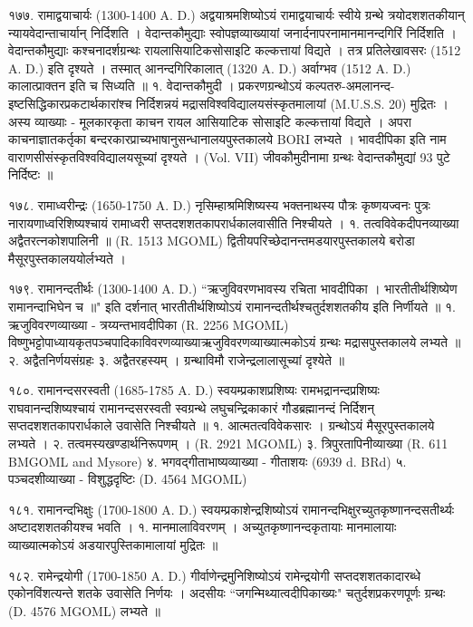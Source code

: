 १७७. रामाद्वयाचार्यः (1300-1400 A. D.)
अद्वयाश्रमशिष्योऽयं रामाद्वयाचार्यः स्वीये ग्रन्थे त्रयोदशशतकीयान् न्यायवेदान्ताचार्यान् निर्दिशति । वेदान्तकौमुद्याः स्वोपज्ञव्याख्यायां जनार्दनापरनामानमानन्दगिरिं निर्दिशति । वेदान्तकौमुद्याः कश्चनादर्शग्रन्थः रायलासियाटिकसोसाइटि कल्कत्तायां विद्यते । तत्र प्रतिलेखावसरः (1512 A. D.) इति दृश्यते । तस्मात् आनन्दगिरिकालात् (1320 A. D.) अर्वाग्भव (1512 A. D.) कालात्प्राक्तन इति च सिध्यति ॥
१. वेदान्तकौमुदी । प्रकरणग्रन्थोऽयं कल्पतरु-अमलानन्द-इष्टसिद्धिकारप्रकटार्थकारांश्च निर्दिशन्नयं मद्रासविश्वविद्यालयसंस्कृतमालायां (M.U.S.S. 20) मुद्रितः । 
अस्य व्याख्याः - मूलकारकृता काचन रायल आसियाटिक सोसाइटि कल्कत्तायां विद्यते । अपरा काचनाज्ञातकर्तृका बन्दरकारप्राच्यभाषानुसन्धानालयपुस्तकालये BORI लभ्यते । भावदीपिका इति नाम वाराणसीसंस्कृतविश्वविद्यालयसूच्यां दृश्यते । (Vol. VII) जीवकौमुदीनामा ग्रन्थः वेदान्तकौमुद्यां 93 पुटे निर्दिष्टः ॥

१७८. रामाध्वरीन्द्रः (1650-1750 A. D.)
नृसिम्हाश्रमिशिष्यस्य भक्तनाथस्य पौत्रः कृष्णयज्वनः पुत्रः नारायणाध्वरिशिष्यश्चायं रामाध्वरी सप्तदशशतकापरार्धकालवासीति निश्चीयते ।
१. तत्वविवेकदीपनव्याख्या अद्वैतरत्नकोशपालिनी ॥ (R. 1513 MGOML) द्वितीयपरिच्छेदानन्तमडयारपुस्तकालये बरोडा मैसूरपुस्तकालययोर्लभ्यते ।

१७९. रामानन्दतीर्थः (1300-1400 A. D.) 
``ऋजुविवरणभावस्य रचिता भावदीपिका । भारतीतीर्थशिष्येण रामानन्दाभिघेन च ॥" इति दर्शनात् भारतीतीर्थशिष्योऽयं रामानन्दतीर्थश्चतुर्दशशतकीय इति निर्णीयते ॥
१. ऋजुविवरणव्याख्या - त्रय्यन्तभावदीपिका (R. 2256 MGOML) विष्णुभट्टोपाध्यायकृतपञ्चपादिकाविवरणव्याख्याऋजुविवरणव्याख्यात्मकोऽयं ग्रन्थः मद्रासपुस्तकालये लभ्यते ॥
२. अद्वैतनिर्णयसंग्रहः
३. अद्वैतरहस्यम् । ग्रन्थाविमौ राजेन्द्रलालासूच्यां दृश्येते ॥

१८०. रामानन्दसरस्वती (1685-1785 A. D.)
स्वयम्प्रकाशप्रशिष्यः रामभद्रानन्दप्रशिष्यः राघवानन्दशिष्यश्चायं रामानन्दसरस्वती स्वग्रन्थे लघुचन्द्रिकाकारं गौडब्रह्मानन्दं निर्दिशन् सप्तदशशतकापरार्धकाले उवासेति निश्चीयते ॥
१. आत्मतत्वविवेकसारः । ग्रन्थोऽयं मैसूरपुस्तकालये लभ्यते ।
२. तत्वमस्यखण्डार्थनिरूपणम् । (R. 2921 MGOML)
३. त्रिपुरतापिनीव्याख्या (R. 611 BMGOML and Mysore)
४. भगवद्गीताभाष्यव्याख्या - गीताशयः (6939 d. BRd)
५. पञ्चदशीव्याख्या - विशुद्धदृष्टिः (D. 4564 MGOML)

१८१. रामानन्दभिक्षुः (1700-1800 A. D.)
स्वयम्प्रकाशेन्द्रशिष्योऽयं रामानन्दभिक्षुरच्युतकृष्णानन्दसतीर्थ्यः अष्टादशशतकीयश्च भवति ।
१. मानमालाविवरणम् । अच्युतकृष्णानन्दकृतायाः मानमालायाः व्याख्यात्मकोऽयं अडयारपुस्तिकामालायां मुद्रितः ॥

१८२. रामेन्द्रयोगी (1700-1850 A. D.)
गीर्वाणेन्द्रमुनिशिष्योऽयं रामेन्द्रयोगी सप्तदशशतकादारब्धे एकोनविंशत्यन्ते शतके उवासेति निर्णयः । अदसीयः ``जगन्मिथ्यात्वदीपिकाख्यः" चतुर्दशप्रकरणपूर्णः ग्रन्थः (D. 4576 MGOML) लभ्यते ॥ 

